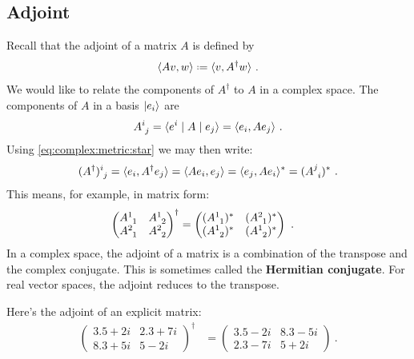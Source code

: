 \subsection{Adjoint}


Recall that the adjoint of a matrix $A$ is defined by
\begin{align}
    \la A v , w \ra \defeq 
    \la v, A^\dag w \ra \ .
\end{align}
We would like to relate the components of $A^\dag$ to $A$ in a complex space. The components of $A$ in a basis $\left|e_i\right\rangle$ are 
\begin{align}
    A\aij{i}{j} = \la e^i \mid A \mid e_j \ra 
    = \la e_i, A e_j \ra \ .
\end{align}
Using \eqref{eq:complex:metric:star} we may then write:
\begin{align}
    (A^\dag)\aij{i}{j}
    = 
    \la e_i, A^\dag e_j \ra
    =
    \la A e_i, e_j \ra
    =
    \la e_j, A e_i \ra^*
    =
    (A\aij{j}{i})^* \ .
\end{align}
This means, for example, in matrix form:
\begin{align}
    \begin{pmatrix}
        A\aij 11 & A\aij 12 \\
        A\aij 21 & A\aij 22 
    \end{pmatrix}^\dag &= 
    \begin{pmatrix}
        (A\aij 11)^* & (A\aij 21)^* \\
        (A\aij 12)^* & (A\aij 12 )^*
    \end{pmatrix} \ .
\end{align}
In a complex space, the adjoint of a matrix is a combination of the transpose and the complex conjugate. This is sometimes called the \textbf{Hermitian conjugate}. For real vector spaces, the adjoint reduces to the transpose. 


\begin{example}
Here's the adjoint of an explicit matrix:
\begin{align}
\begin{pmatrix}
        3.5 +2i & 2.3+7i \\
        8.3 + 5i & 5-2i
    \end{pmatrix}^\dag &= 
    \begin{pmatrix}
        3.5 -2i &  8.3 - 5i\\
        2.3 -7i & 5 +2i
    \end{pmatrix} \ .
\end{align}
\end{example}

